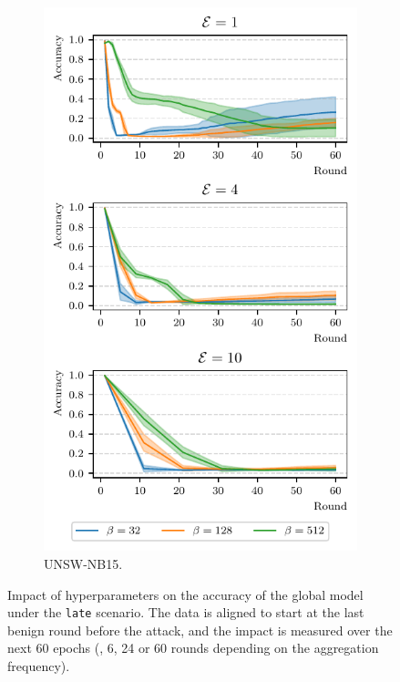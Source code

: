 \begin{figure}[t]
\begin{subfigure}{.49\linewidth}
    \includegraphics[width=\linewidth]{figures/nb15/hyperparams-late}
    \caption{
      UNSW-NB15.
      \label{fig:assess.hyperparams-late.nb15}
    }
  \end{subfigure}
  \caption[
    Impact of hyperparameters on the accuracy of the global model under the \texttt{late} scenario.
  ]{
    Impact of hyperparameters on the accuracy of the global model under the \texttt{late} scenario.
    The data is aligned to start at the last benign round before the attack, and the impact is measured over the next 60 epochs (\ie, 6, 24 or 60 rounds depending on the aggregation frequency).
    \label{fig:assess.hyperparams-late}
  }
\end{figure}

